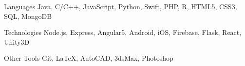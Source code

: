 

\begin{cvskills}

  \cvskill
    {Languages} %
    {Java, C/C++, JavaScript, Python, Swift, PHP, R, HTML5, CSS3, SQL, MongoDB} %

  \cvskill
    {Technologies} %
    {Node.js, Express, Angular5, Android, iOS, Firebase, Flask, React, Unity3D} %

  \cvskill
    {Other Tools} %
    {Git, \LaTeX, AutoCAD, 3dsMax, Photoshop} %

\end{cvskills}
